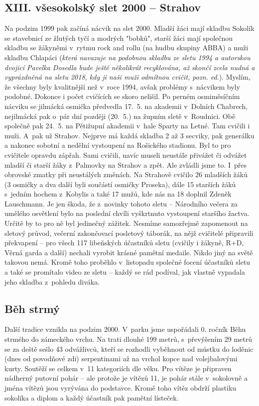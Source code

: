 \documentclass[a5paper, 11pt, twoside]{article}
\begin{document}
\subsection{XIII. všesokolský slet 2000 --
Strahov}

Na podzim 1999 pak začíná nácvik na slet 2000. Mladší žáci mají skladbu
Sokolík se stavebnicí ze žlutých tyčí a modrých "bobků", starší žáci
mají společnou skladbu se žákyněmi v~rytmu rock and rollu (na hudbu
skupiny ABBA) a muži skladbu Chlapáci (\textit{která navazuje na podobnou
skladbu ze sletu 1994 a autorskou dvojicí Pavelka Dosedla bude ještě
několikrát recyklována, až skončí zcela nudná a vyprázdněná na sletu
2018, kdy ji naši muži odmítnou cvičit, pozn. ed}.). Myslím, že všechny
byly kvalitnější než v~roce 1994, avšak problémy s~nácvikem byly
podobné. Dokonce i počet cvičících se skoro nelišil. Po perném
osmiměsíčním nácviku se jilmácká osmička předvedla 17.~5. na akademii
v~Dolních Chabrech, nejilmácká pak o~pár dní později (20.~5.) na župním
sletě v~Roudnici. Obě společně pak 24.~5. na Pětižupní akademii v~hale
Sparty na Letné. Tam cvičili i muži. A~pak už Strahov. Nejprve má každá
skladba 2 až 3 secviky, pak generálku a nakonec sobotní a nedělní
vystoupení na Rošického stadionu. Byl to pro cvičitele opravdu zápřah.
Sami cvičili, navíc museli neustále přivážet či odvážet mladší či starší
žáky z~Palmovky na Strahov a zpět. Ale zvládli jsme to. I~přes obrovské
zmatky při neustálých změnách. Na Strahově cvičilo 26 mladších žáků (3
osmičky a dva další byli součástí osmičky Proseka), dále 15 starších
žáků s~jedním hochem z~Kobylis a také 17 mužů, kde nás na 18 doplnil
Zdeněk Lauschmann. Je jen škoda, že z~novinky tohoto sletu -- Národního
večera za umělého osvětlení bylo na poslední chvíli vyškrtnuto
vystoupení staršího žactva. Určitě by to pro ně byl jedinečný zážitek.
Nesmíme samozřejmě zapomenout na sletový průvod, večerní zakončovací
posletový táborák, na nějž cvičitelé připravili překvapení -- pro všech
117 libeňských účastníků sletu (cvičily i žákyně, R+D, Věrná garda a
další) nechali vyrobit krásné pamětní medaile. Nikdo jiný na světě
takovou nemá. Kromě toho proběhlo v~listopadu společné focení účastníků
sletu a také se promítalo video ze sletu -- každý se rád podíval, jak
vlastně vypadala jeho skladba z~pohledu diváka.

\subsection{Běh strmý}

Další tradice vznikla na podzim 2000. V~parku jsme uspořádali 0. ročník
Běhu strmého do zámeckého vrchu. Na trati dlouhé 199 metrů, s~převýšením
29 metrů se za deště sešlo 43 odvážlivců, kteří se rozhodli vyběhnout od
můstku do loděnic (dnes od povodňové zdi) serpentinami až na vrchol
kopce nad volejbalovými kurty. Soutěží se celkem v~11 kategoriích dle
věku. Pro vítěze je připraven nádherný putovní pohár -- ale protože je
vítězů 11, je pohár stále v~sokolovně a jména vítězů jsou vyrývána do
podstavce. Kromě toho vítěz obdrží plastiku sokolíka a diplom a každý
účastník pak pamětní lísteček.
\end{document}
